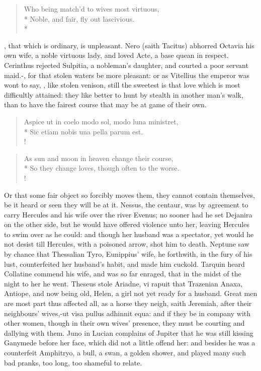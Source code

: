 \begin{verse}%
Who being match'd to wives most virtuous,\\*
Noble, and fair, fly out lascivious.\\*
\end{verse}%
%

, that which is ordinary, is unpleasant. Nero
(saith Tacitus) abhorred Octavia his own wife, a noble virtuous lady,
and loved Acte, a base quean in respect. Cerinthus rejected
Sulpitia, a nobleman's daughter, and courted a poor servant maid.-, for that stolen waters be more
pleasant: or as Vitellius the emperor was wont to say, , like stolen venison, still the
sweetest is that love which is most difficultly attained: they like
better to hunt by stealth in another man's walk, than to have the
fairest course that may be at game of their own.
%
\begin{latin}%
\begin{verse}%
Aspice ut in coelo modo sol, modo luna ministret,\\*
Sic etiam nobis una pella parum est.\\!
\end{verse}%
\end{latin}%
\translationrule%
\begin{verse}%
As sun and moon in heaven change their course,\\*
So they change loves, though often to the worse.\\!
\end{verse}%
%

Or that some fair object so forcibly moves them, they cannot contain
themselves, be it heard or seen they will be at it. Nessus, the
centaur, was by agreement to carry Hercules and his wife over the river
Evenus; no sooner had he set Dejanira on the other side, but he would
have offered violence unto her, leaving Hercules to swim over as he
could: and though her husband was a spectator, yet would he not desist
till Hercules, with a poisoned arrow, shot him to death. Neptune
saw by chance that Thessalian Tyro, Eunippius' wife, he forthwith, in
the fury of his lust, counterfeited her husband's habit, and made him
cuckold. Tarquin heard Collatine commend his wife, and was so far
enraged, that in the midst of the night to her he went. Theseus
stole Ariadne, vi rapuit that Trazenian Anaxa, Antiope, and now being
old, Helen, a girl not yet ready for a husband. Great men are most part
thus affected all, as a horse they neigh, saith Jeremiah, after
their neighbours' wives,-ut visa pullus adhinnit equa: and if they be
in company with other women, though in their own wives' presence, they
must be courting and dallying with them. Juno in Lucian complains of
Jupiter that he was still kissing Ganymede before her face, which did
not a little offend her: and besides he was a counterfeit Amphitryo, a
bull, a swan, a golden shower, and played many such bad pranks, too
long, too shameful to relate.

